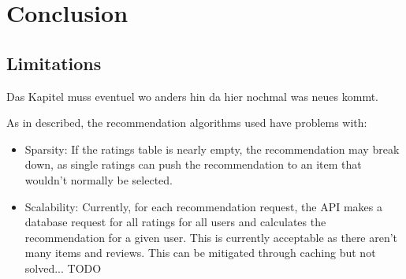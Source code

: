 \chapter{Conclusion}

\section{Limitations}

Das Kapitel muss eventuel wo anders hin da hier nochmal was neues kommt.

As in \cite{itemColFiltRecom} described, the recommendation algorithms used have problems with:

\begin{itemize}
    \item Sparsity: If the ratings table is nearly empty, the recommendation may break down, as single ratings can push the recommendation to an item that wouldn't normally be selected.
    \item Scalability: Currently, for each recommendation request, the API makes a database request for all ratings for all users and calculates the recommendation for a given user. This is currently acceptable as there aren't many items and reviews. This can be mitigated through caching but not solved... TODO
\end{itemize}